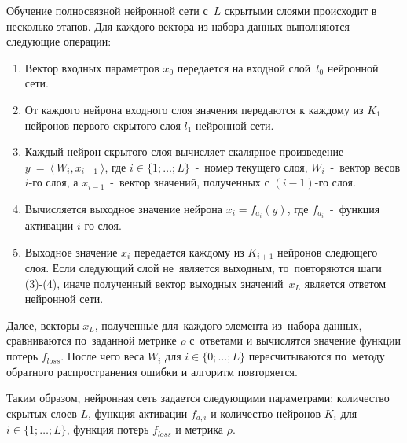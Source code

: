 Обучение полносвязной\cite[с.\,44]{bib:neural_networks} нейронной сети с~$L$ скрытыми слоями\cite[с.\,43]{bib:neural_networks} происходит в несколько этапов. Для каждого вектора из набора данных выполняются следующие операции:
\begin{enumerate}\label{alg:neural_education}
\item Вектор входных параметров $x_0$ передается на входной слой~$l_0$ нейронной сети.
\item От каждого нейрона входного слоя значения передаются к каждому из $K_1$ нейронов первого скрытого слоя $l_1$ нейронной сети.
\item Каждый нейрон скрытого слоя вычисляет скалярное произведение \newline $y~=~\langle~W_i, x_{i-1}~\rangle$, где $i\in\{1; \dots; L\}$~-~номер текущего слоя, $W_i$~-~вектор весов $i$-го слоя, а $x_{i-1}$~-~вектор значений, полученных с $(i-1)$-го слоя.
\item Вычисляется выходное значение нейрона $x_i = f_{a_i}(y)$, где $f_{a_i}$~-~функция активации\cite[с.\,151]{bib:neural_networks2} $i$-го слоя.
\item Выходное значение $x_i$ передается каждому из $K_{i+1}$ нейронов следющего слоя. Если следующий слой не~является выходным, то~повторяются шаги (3)-(4), иначе полученный вектор выходных значений~$x_L$ является ответом нейронной сети.
\end{enumerate}
Далее, векторы $x_L$, полученные для~каждого элемента из~набора данных, сравниваются по~заданной метрике\cite{bib:metrics} $\rho$ с~ответами
и вычислятся значение функции потерь\cite[с.\,65]{bib:neural_networks2} $f_{loss}$. После чего веса $W_i$ для $i\in\{0; \dots; L\}$ пересчитываются по~методу обратного распространения ошибки\cite[с.\,151-184]{bib:neural_networks2} и алгоритм повторяется.

Таким образом, нейронная сеть задается следующими параметрами: количество скрытых слоев $L$, функция активации $f_{a,i}$ и количество нейронов $K_i$ для $i\in\{1; \dots; L\}$, функция потерь $f_{loss}$ и метрика $\rho$.

